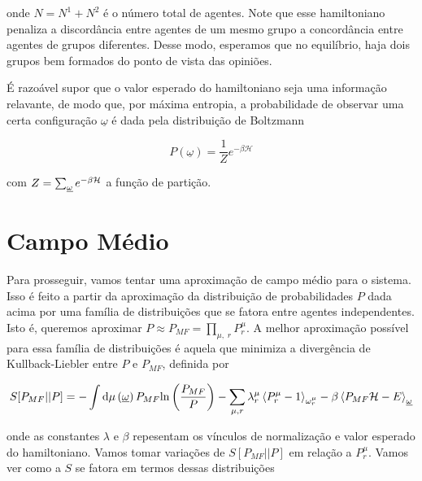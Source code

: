 \documentclass[a4paper, 11pt]{article} %
\newcommand{\msr}[1]{\ensuremath{\displaystyle%
    \mathrm{d}\mu\left(#1\right)}}
\newcommand{\agent}[2]{%
    \omega^{#2}_{#1}}
\newcommand{\conf}{%
    \underline \omega}
\renewcommand{\H}{%
    \mathcal{H}}
\newcommand{\inp}[1]{\ensuremath{\displaystyle%
    \left(#1\right)}}
\newcommand{\ina}[1]{\ensuremath{\displaystyle%
    \left<#1\right>}}
\begin{document}
onde $N = N^1 + N^2$ é o número total de agentes. Note que esse hamiltoniano
penaliza a discordância entre agentes de um mesmo grupo a concordância entre
agentes de grupos diferentes. Desse modo, esperamos que no equilíbrio, haja dois
grupos bem formados do ponto de vista das opiniões.

É razoável supor que o valor
esperado do hamiltoniano seja uma informação relavante, de modo que, por máxima
entropia, a probabilidade de observar uma certa configuração $\conf$
é dada pela distribuição de Boltzmann 

\[P(\conf) = \frac{1}{Z}e^{-\beta \H}\]

com $ Z = \sum_{\conf} e^{-\beta \H} $ a função de
partição.


\section*{Campo Médio}

Para prosseguir, vamos tentar uma aproximação de campo médio para o sistema.
Isso é feito a partir da aproximação da distribuição de probabilidades $P$ dada
acima por uma família de distribuições que se fatora entre agentes
independentes. Isto é, queremos aproximar $P \approx P_{MF} =
\prod_{\mu,\;r}P^{\mu}_r $. A melhor aproximação possível para essa família
de distribuições é aquela que minimiza a divergência de Kullback-Liebler entre
$P$ e $P_{MF}$, definida por 

\begin{equation}
    S[P_{MF}||P] = -\int
    \msr{\conf}P_{MF}\mathrm{ln}\inp{\frac{P_{MF}}{P}}
    -\sum_{\mu,r}\lambda_r^{\mu}\ina{P^{\mu}_r-1}_{\agent{r}{\mu}} 
    - \beta\ina{P_{MF}\H - E}_{\conf}
\end{equation}

onde as constantes $\lambda$ e $\beta$ repesentam os vínculos de normalização e
valor esperado do hamiltoniano. Vamos tomar variações de $S[P_{MF}||P]$ em
relação a $P^{\mu}_r$. Vamos ver como a $S$ se fatora em termos dessas
distribuições
\end{document}
